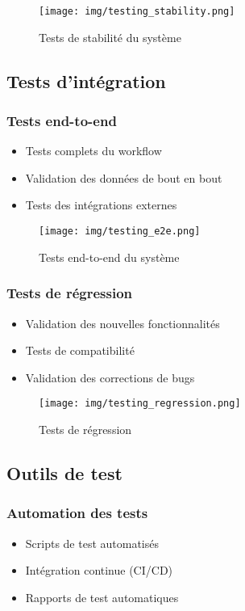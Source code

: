 \begin{figure}[H]
    \centering
    \texttt{[image: img/testing\_stability.png]}
    \caption{Tests de stabilité du système}
    \label{fig:testing_stability}
\end{figure}

\subsection{Tests d'intégration}
\subsubsection{Tests end-to-end}
\begin{itemize}
    \item Tests complets du workflow
    \item Validation des données de bout en bout
    \item Tests des intégrations externes
\end{itemize}

\begin{figure}[H]
    \centering
    \texttt{[image: img/testing\_e2e.png]}
    \caption{Tests end-to-end du système}
    \label{fig:testing_e2e}
\end{figure}

\subsubsection{Tests de régression}
\begin{itemize}
    \item Validation des nouvelles fonctionnalités
    \item Tests de compatibilité
    \item Validation des corrections de bugs
\end{itemize}

\begin{figure}[H]
    \centering
    \texttt{[image: img/testing\_regression.png]}
    \caption{Tests de régression}
    \label{fig:testing_regression}
\end{figure}

\subsection{Outils de test}
\subsubsection{Automation des tests}
\begin{itemize}
    \item Scripts de test automatisés
    \item Intégration continue (CI/CD)
    \item Rapports de test automatiques
\end{itemize}

